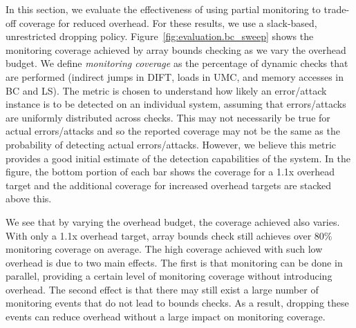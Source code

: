 In this section, we evaluate the effectiveness of
using partial monitoring to trade-off coverage for reduced overhead.
For these results, we use a slack-based, unrestricted dropping policy.
Figure~\ref{fig:evaluation.bc_sweep} shows the monitoring coverage achieved by
array bounds checking as we vary the overhead budget. 
We define \emph{monitoring coverage} as the 
percentage of dynamic checks that are performed 
(indirect jumps in DIFT, loads in UMC, and memory accesses in BC and LS). 
The metric is chosen to understand
how likely an error/attack instance is to be detected on an individual system, 
assuming that errors/attacks are uniformly distributed across checks. This may
not necessarily be true for actual errors/attacks and so the reported coverage
may not be the same as the probability of detecting actual errors/attacks.
However, we believe this metric
provides a good initial estimate of the detection capabilities of the system.
In the figure, the bottom portion of each
bar shows the coverage for a 1.1x overhead target and the additional
coverage for increased overhead targets are stacked above this.

We see that by varying the overhead budget, the coverage achieved also varies.
With only a 1.1x overhead target, array bounds check still
achieves over 80\% monitoring coverage on average. The high coverage
achieved with such low overhead is due to two main effects.  The first is that
monitoring can be done in parallel, providing a certain level of monitoring coverage without
introducing overhead. The second effect is that there may still exist a large number of
monitoring events that do not lead to bounds checks. As a
result, dropping these events can reduce overhead without a large impact on
monitoring coverage.

